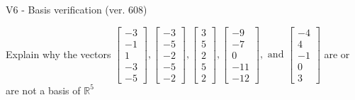 \begin{exercise}
  \begin{exerciseTitle}V6 - Basis verification (ver. 608)\end{exerciseTitle}
  \begin{exerciseStatement}
    Explain why the vectors \(\left[\begin{array}{r}
-3 \\
-1 \\
1 \\
-3 \\
-5
\end{array}\right] , \left[\begin{array}{r}
-3 \\
-5 \\
-2 \\
-5 \\
-2
\end{array}\right] , \left[\begin{array}{r}
3 \\
5 \\
2 \\
5 \\
2
\end{array}\right] , \left[\begin{array}{r}
-9 \\
-7 \\
0 \\
-11 \\
-12
\end{array}\right] , \text{ and } \left[\begin{array}{r}
-4 \\
4 \\
-1 \\
0 \\
3
\end{array}\right]\) are or are not a basis of \(\mathbb{R}^5\)	



\end{exerciseStatement}
\end{exercise}
